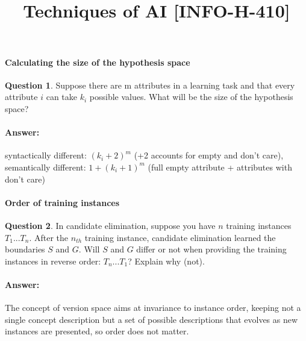 \documentclass[11pt,a4paper]{article}
\date{\vspace{-1.7cm}\version}
\title{\vspace{-2cm} \tpnumber \\ Techniques of AI [INFO-H-410] \ifthenelse{\boolean{corrige}}{~\\Correction}{}}
\theoremstyle{definition}%
\newtheorem{Q}{Question}[] %
\newcommand{\reponse}[1]{%
\ifthenelse {\boolean{corrige}} {\paragraph{Answer:} \color{darkblue}   #1\color{black}} {}
}
\begin{document}

\maketitle

\paragraph{Calculating the size of the hypothesis space}
\begin{Q}
    Suppose there are m attributes in a learning task and that every attribute $i$ can take $k_i$
possible values. What will be the size of the hypothesis space?
\reponse{
    syntactically different: $(k_i+2)^m$ (+2 accounts for empty and don't care),
    semantically different: $1+(k_i+1)^m$ (full empty attribute + attributes with don't care)
}
\end{Q}

\paragraph{Order of training instances}
\begin{Q}
    In candidate elimination, suppose you have $n$ training instances $T_1...T_n$. After the $n_{th}$
training instance, candidate elimination learned the boundaries $S$ and $G$. Will $S$ and $G$
differ or not when providing the training instances in reverse order: $T_n...T_1$? Explain why
(not).
\reponse{
   The concept of version space aims at invariance to instance order, keeping not a
single concept description but a set of possible descriptions that evolves as new instances
are presented, so order does not matter.
}
\end{Q}
\end{document}
